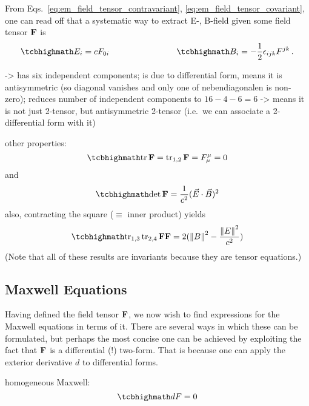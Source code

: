\documentclass[../relativity_main.tex]{subfiles}
\begin{document}
From Eqs.~\eqref{eq:em_field_tensor_contravariant}, \eqref{eq:em_field_tensor_covariant}, one can read off that a systematic way to extract E-, B-field given some field tensor $\mathbf{F}$ is
\begin{equation}
	\eqbox{
		E_i = c F_{0 i}
	}
	\manyqquad
	\eqbox{
		B_i = - \frac{1}{2} \epsilon_{ijk} F^{jk}
	}
	\, .
\end{equation}


-> has six independent components; is due to differential form, means it is antisymmetric (so diagonal vanishes and only one of nebendiagonalen is non-zero); reduces number of independent components to $16 - 4 - 6 = 6$ -> means it is not just 2-tensor, but antisymmetric 2-tensor (i.e.~we can associate a 2-differential form with it)


other properties:
\begin{equation}
	\eqbox{
		\tr \tensor{F} = \tr_{1, 2} \tensor{F} = F^\mu_\mu = 0
	}
\end{equation}
and
\begin{equation}
	\eqbox{
		\det \tensor{F} = \frac{1}{c^2} (\vec{E} \cdot \vec{B})^2
	}
\end{equation}
also, contracting the square ($\equiv$ inner product) yields
\begin{equation}
	\eqbox{
		\tr_{1, 3} \tr_{2, 4} \tensor{F} \tensor{F} = 2 (\norm{B}^2 - \frac{\norm{E}^2}{c^2})
	}
\end{equation}
(Note that all of these results are invariants because they are tensor equations.)



		\subsection{Maxwell Equations}
Having defined the field tensor $\mathbf{F}$, we now wish to find expressions for the Maxwell equations in terms of it. There are several ways in which these can be formulated, but perhaps the most concise one can be achieved by exploiting the fact that $\mathbf{F}$ is a differential (!) two-form. That is because one can apply the exterior derivative $d$ to differential forms.



homogeneous Maxwell:
\begin{equation}
	\eqbox{
		dF = 0
	}
\end{equation}
\end{document}
